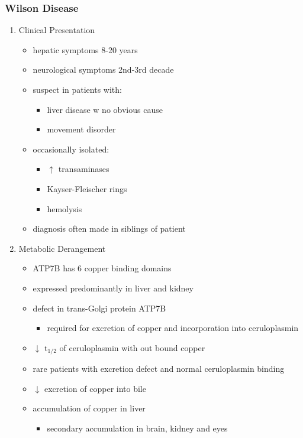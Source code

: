 \documentclass{scrartcl}
\begin{document}
\subsubsection{Wilson Disease}
\label{sec:org31aae4f}
\begin{enumerate}
\item Clinical Presentation
\label{sec:org8a673c2}
\begin{itemize}
\item hepatic symptoms 8-20 years
\item neurological symptoms 2nd-3rd decade
\item suspect in patients with:
\begin{itemize}
\item liver disease w no obvious cause
\item movement disorder
\end{itemize}
\item occasionally isolated:
\begin{itemize}
\item \(\uparrow\) transaminases
\item Kayser-Fleischer rings
\item hemolysis
\end{itemize}
\item diagnosis often made in siblings of patient
\end{itemize}

\item Metabolic Derangement
\label{sec:org84ca4d9}
\begin{itemize}
\item ATP7B has 6 copper binding domains
\item expressed predominantly in liver and kidney
\item defect in trans-Golgi protein ATP7B
\begin{itemize}
\item required for excretion of copper and incorporation into ceruloplasmin
\end{itemize}
\item \(\downarrow\) t\(_{\text{1/2}}\) of ceruloplasmin with out bound copper
\item rare patients with excretion defect and normal ceruloplasmin binding
\item \(\downarrow\) excretion of copper into bile
\item accumulation of copper in liver
\begin{itemize}
\item secondary accumulation in brain, kidney and eyes
\end{itemize}
\end{itemize}


\end{enumerate}
\end{document}
